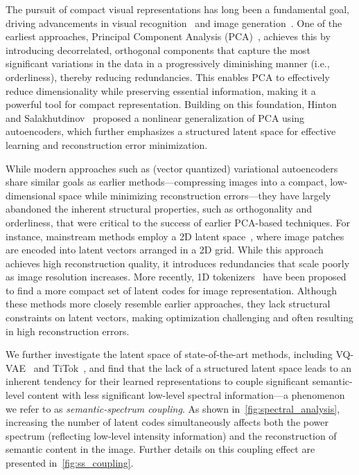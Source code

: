 \documentclass[10pt,twocolumn,letterpaper]{article}
\begin{document}
The pursuit of compact visual representations has long been a fundamental goal, driving advancements in visual recognition~\cite{turk1991face,hinton2006reducing} and image generation~\cite{titok,VQVAE}. 
One of the earliest approaches, Principal Component Analysis (PCA)~\cite{shlens2014tutorial}, achieves this by introducing decorrelated, orthogonal components that capture the most significant variations in the data in a progressively diminishing manner (i.e., orderliness), thereby reducing redundancies. 
This enables PCA to effectively reduce dimensionality while preserving essential information, making it a powerful tool for compact representation. 
Building on this foundation, Hinton and Salakhutdinov~\cite{hinton2006reducing} proposed a nonlinear generalization of PCA using autoencoders, which further emphasizes a structured latent space for effective learning and reconstruction error minimization.





While modern approaches such as (vector quantized) variational autoencoders~\cite{VQVAE,vae} share similar goals as earlier methods---compressing images into a compact, low-dimensional space while minimizing reconstruction errors---they have largely abandoned the inherent structural properties, such as orthogonality and orderliness, that were critical to the success of earlier PCA-based techniques.
For instance, mainstream methods employ a 2D latent space~\cite{llamagen,vae,VQVAE}, where image patches are encoded into latent vectors arranged in a 2D grid. While this approach achieves high reconstruction quality, it introduces redundancies that scale poorly as image resolution increases. More recently, 1D tokenizers~\cite{titok,alit} have been proposed to find a more compact set of latent codes for image representation. Although these methods more closely resemble earlier approaches, they lack structural constraints on latent vectors, making optimization challenging and often resulting in high reconstruction errors. 

We further investigate the latent space of state-of-the-art methods, including VQ-VAE~\cite{llamagen} and TiTok~\cite{titok}, and find that the lack of a structured latent space leads to an inherent tendency for their learned representations to couple significant semantic-level content with less significant low-level spectral information---a phenomenon we refer to as \textit{semantic-spectrum coupling}.
As shown in~\cref{fig:spectral_analysis}, increasing the number of latent codes simultaneously affects both the power spectrum (reflecting low-level intensity information) and the reconstruction of semantic content in the image. Further details on this coupling effect are presented in~\cref{fig:ss_coupling}.
\end{document}
